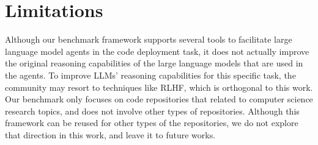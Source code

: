 \section*{Limitations}
Although our benchmark framework supports several tools to facilitate large language model agents in the code deployment task, it does not actually improve the original reasoning capabilities of the large language models that are used in the agents. To improve LLMs' reasoning capabilities for this specific task, the community may resort to techniques like RLHF, which is orthogonal to this work. Our benchmark only focuses on code repositories that related to computer science research topics, and does not involve other types of repositories. Although this framework can be reused for other types of the repositories, we do not explore that direction in this work, and leave it to future works.